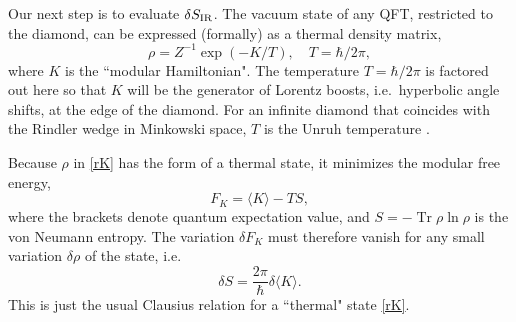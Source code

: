 \documentclass[aps,prd,showpacs,groupedaddress,nofootinbib,longbibliography,12pt]{revtex4-1}
\DeclareMathOperator{\Tr}{Tr}
\def\beq{\begin{equation}}
\def\eeq{\end{equation}}
\def\la{\langle}
\def\ra{\rangle}
\def\d{\delta}\def\D{\Delta}
\def\r{\rho}
\begin{document}





Our next step is to evaluate $\d S_{\rm IR}$.
The vacuum state of any QFT, restricted to the diamond, can be expressed (formally) as a
thermal density matrix, 
%
\beq\label{rK}
\r = Z^{-1}\exp(-K/T),\quad T=\hbar/2\pi,
\eeq
%
where $K$ is the ``modular Hamiltonian".  
The temperature $T=\hbar/2\pi$ is factored out here so that $K$ will be the 
generator of Lorentz boosts, i.e.\ hyperbolic angle shifts, at the edge of the diamond. 
For an infinite diamond that coincides with the Rindler wedge in Minkowski space, 
$T$ is the Unruh temperature \cite{Unruh1976, Sewell1982}.



Because $\r$ in \eqref{rK} has the form of a thermal state, it minimizes the modular free energy, 
%
\beq\label{FK}
F_K =\la K\ra - TS,
\eeq
%
where  the brackets denote quantum expectation value, and $S=-\Tr \r\ln\r$ is the von Neumann entropy. 
The variation $\d F_K$ must therefore vanish for any small variation  $\d\r$ of the state, i.e.\  
%
\beq\label{dSK}
\d S = \frac{2\pi}{\hbar}\d \la K\ra.
\eeq
%
This is just the usual Clausius relation for a ``thermal" state \eqref{rK}.
\end{document}
